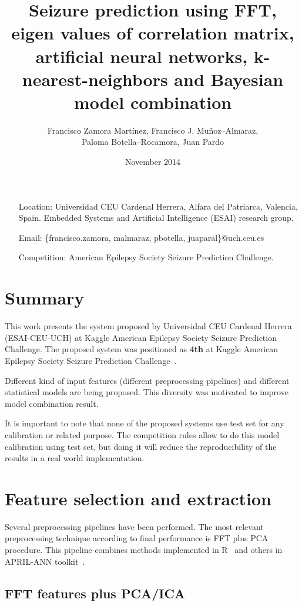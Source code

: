 \documentclass[a4paper,english,twoside]{article}
\author{Francisco Zamora Martínez, Francisco J. Mu\~noz--Almaraz,\\
  Paloma Botella--Rocamora, Juan Pardo}
\date{November 2014}
\title{Seizure prediction using FFT, eigen values of correlation matrix,
  artificial neural networks, k-nearest-neighbors and Bayesian model combination}
\begin{document}
\maketitle

\begin{itemize}
\item[Location:] Universidad CEU Cardenal Herrera, Alfara del Patriarca,
  Valencia, Spain. Embedded Systems and Artificial Intelligence (ESAI) research
  group.
\item[Email:] \{francisco.zamora, malmaraz, pbotella, juaparal\}@uch.ceu.es
\item[Competition:] American Epilepsy Society Seizure Prediction Challenge.
\end{itemize}

\section{Summary}\label{summary}

This work presents the system proposed by Universidad CEU Cardenal
Herrera (ESAI-CEU-UCH) at Kaggle American Epilepsy Society Seizure
Prediction Challenge. The proposed system was positioned as \textbf{4th}
at Kaggle American Epilepsy Society Seizure Prediction Challenge~\cite{kaggle}.

Different kind of input features (different preprocessing pipelines) and
different statistical models are being proposed. This diversity was motivated to
improve model combination result.

It is important to note that none of the proposed systems use test set
for any calibration or related purpose. The competition rules allow to do this
model calibration using test set, but doing it will reduce the
reproducibility of the results in a real world implementation.

\section{Feature selection and
  extraction}\label{feature-selection-and-extraction}

Several preprocessing pipelines have been performed. The most relevant
preprocessing technique according to final performance is FFT plus PCA
procedure. This pipeline combines methods implemented in R~\cite{Rproject} and
others in APRIL-ANN toolkit~\cite{aprilann}.

\subsection{FFT features plus PCA/ICA}\label{fft-features-plus-pcaica}
\end{document}
